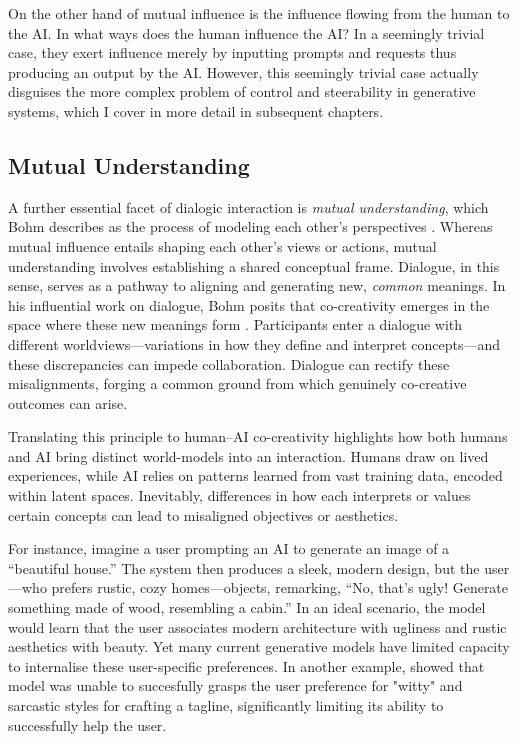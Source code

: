 On the other hand of mutual influence is the influence flowing from the human to the AI. In what ways does the human influence the AI? In a seemingly trivial case, they exert influence merely by inputting prompts and requests thus producing an output by the AI. However, this seemingly trivial case actually disguises the more complex problem of control and steerability in generative systems, which I cover in more detail in subsequent chapters.

\subsection{Mutual Understanding}

A further essential facet of dialogic interaction is \textit{mutual understanding}, which Bohm describes as the process of modeling each other’s perspectives \cite{Bohm1996-fo}. Whereas mutual influence entails shaping each other’s views or actions, mutual understanding involves establishing a shared conceptual frame. Dialogue, in this sense, serves as a pathway to aligning and generating new, \textit{common} meanings. In his influential work on dialogue, Bohm posits that co-creativity emerges in the space where these new meanings form \cite{Bohm1996-fo}. Participants enter a dialogue with different worldviews—variations in how they define and interpret concepts—and these discrepancies can impede collaboration. Dialogue can rectify these misalignments, forging a common ground from which genuinely co-creative outcomes can arise.

Translating this principle to human–AI co-creativity highlights how both humans and AI bring distinct world-models into an interaction. Humans draw on lived experiences, while AI relies on patterns learned from vast training data, encoded within latent spaces. Inevitably, differences in how each interprets or values certain concepts can lead to misaligned objectives or aesthetics.

For instance, imagine a user prompting an AI to generate an image of a “beautiful house.” The system then produces a sleek, modern design, but the user—who prefers rustic, cozy homes—objects, remarking, “No, that’s ugly! Generate something made of wood, resembling a cabin.” In an ideal scenario, the model would learn that the user associates modern architecture with ugliness and rustic aesthetics with beauty. Yet many current generative models have limited capacity to internalise these user-specific preferences. In another example, \cite{Bown2024-yx} showed that model was unable to succesfully grasps the user preference for "witty" and sarcastic styles for crafting a tagline, significantly limiting its ability to successfully help the user. 

